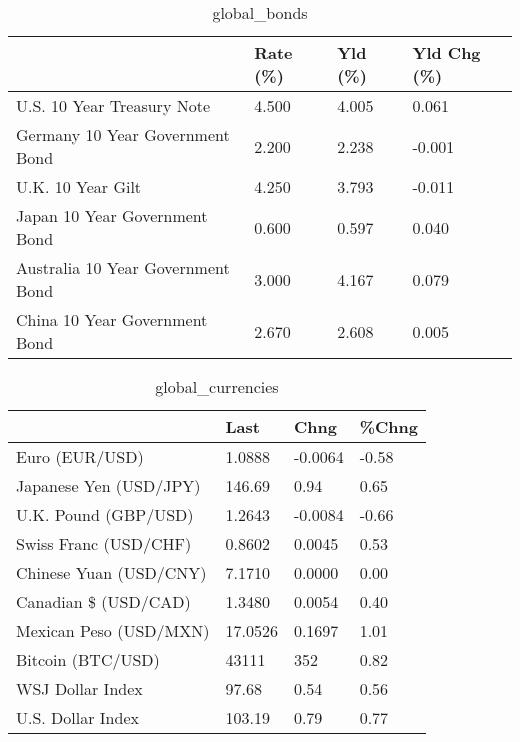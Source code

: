 \documentclass{article}%
\begin{document}
%


\begin{table}[htbp]%
\caption{global\_bonds}%
\centering%
\begin{adjustbox}{width=1\textwidth}%
\begin{tabular}{llll}
\toprule
                                  & Rate (\%) & Yld (\%) & Yld Chg (\%) \\
\midrule
       U.S. 10 Year Treasury Note &    4.500 &   4.005 &       0.061 \\
  Germany 10 Year Government Bond &    2.200 &   2.238 &      -0.001 \\
                U.K. 10 Year Gilt &    4.250 &   3.793 &      -0.011 \\
    Japan 10 Year Government Bond &    0.600 &   0.597 &       0.040 \\
Australia 10 Year Government Bond &    3.000 &   4.167 &       0.079 \\
    China 10 Year Government Bond &    2.670 &   2.608 &       0.005 \\
\bottomrule
\end{tabular}
%
\end{adjustbox}%
\end{table}

%


\begin{table}[htbp]%
\caption{global\_currencies}%
\centering%
\begin{adjustbox}{width=1\textwidth}%
\begin{tabular}{llll}
\toprule
                       &    Last &    Chng & \%Chng \\
\midrule
        Euro (EUR/USD) &  1.0888 & -0.0064 & -0.58 \\
Japanese Yen (USD/JPY) &  146.69 &    0.94 &  0.65 \\
  U.K. Pound (GBP/USD) &  1.2643 & -0.0084 & -0.66 \\
 Swiss Franc (USD/CHF) &  0.8602 &  0.0045 &  0.53 \\
Chinese Yuan (USD/CNY) &  7.1710 &  0.0000 &  0.00 \\
  Canadian \$ (USD/CAD) &  1.3480 &  0.0054 &  0.40 \\
Mexican Peso (USD/MXN) & 17.0526 &  0.1697 &  1.01 \\
     Bitcoin (BTC/USD) &   43111 &     352 &  0.82 \\
      WSJ Dollar Index &   97.68 &    0.54 &  0.56 \\
     U.S. Dollar Index &  103.19 &    0.79 &  0.77 \\
\bottomrule
\end{tabular}
%
\end{adjustbox}%
\end{table}
\end{document}
